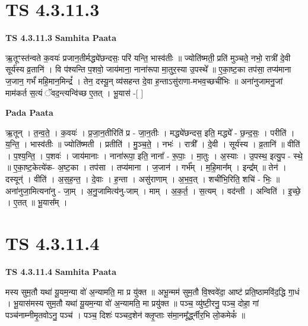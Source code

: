 \documentclass[17pt]{extarticle}
\begin{document}
\section*{ TS 4.3.11.3 }

\textbf{TS 4.3.11.3 } \newline
\textbf{Samhita Paata} \newline

ऋ॒तूꣳस्त॑न्वते क॒वयः॑ प्रजान॒तीर्मद्ध्ये॑छन्दसः॒ परि॑ यन्ति॒ भास्व॑तीः ॥ ज्योति॑ष्मती॒ प्रति॑ मुञ्चते॒ नभो॒ रात्री॑ दे॒वी सूर्य॑स्य व्र॒तानि॑ । वि प॑श्यन्ति प॒शवो॒ जाय॑माना॒ नाना॑रूपा मा॒तुर॒स्या उ॒पस्थे᳚ ॥ ए॒का॒ष्ट॒का तप॑सा॒ तप्य॑माना ज॒जान॒ गर्भं॑ महि॒मान॒मिन्द्रं᳚ । तेन॒ दस्यू॒न् व्य॑सहन्त दे॒वा ह॒न्ताऽसु॑राणा-मभव॒च्छची॑भिः ॥ अना॑नुजामनु॒जां माम॑कर्त स॒त्यं ॅवद॒न्त्यन्वि॑च्छ ए॒तत् । भू॒यास॑ -[  ] \newline

\textbf{Pada Paata} \newline

ऋ॒तून् । त॒न्व॒ते॒ । क॒वयः॑ । प्र॒जा॒न॒तीरिति॑ प्र - जा॒न॒तीः । मद्ध्ये॑छन्दस॒ इति॒ मद्ध्ये᳚ - छ॒न्द॒सः॒ । परीति॑ । य॒न्ति॒ । भास्व॑तीः ॥ ज्योति॑ष्मती । प्रतीति॑ । मु॒ञ्च॒ते॒ । नभः॑ । रात्री᳚ । दे॒वी । सूर्य॑स्य । व्र॒तानि॑ ॥ वीति॑ । प॒श्य॒न्ति॒ । प॒शवः॑ । जाय॑मानाः । नाना॑रूपा॒ इति॒ नाना᳚ - रू॒पाः॒ । मा॒तुः । अ॒स्याः । उ॒पस्थ॒ इत्यु॒प - स्थे॒ ॥ ए॒का॒ष्ट॒केत्ये॑क- अ॒ष्ट॒का । तप॑सा । तप्य॑माना । ज॒जान॑ । गर्भ᳚म् । म॒हि॒मान᳚म् । इन्द्र᳚म् ॥ तेन॑ । दस्यून्॑ । वीति॑ । अ॒स॒ह॒न्त॒ । दे॒वाः । ह॒न्ता । असु॑राणाम् । अ॒भ॒व॒त् । शची॑भि॒रिति॒ शचि॑ - भिः॒ ॥ अना॑नुजा॒मित्यना॑नु - जा॒म् । अ॒नु॒जामित्य॑नु-जाम् । माम् । अ॒क॒र्त॒ । स॒त्यम् । वद॑न्ती । अन्विति॑ । इ॒च्छे॒ । ए॒तत् ॥ भू॒यास᳚म् ।  \newline




\section*{ TS 4.3.11.4 }

\textbf{TS 4.3.11.4 } \newline
\textbf{Samhita Paata} \newline

मस्य सुम॒तौ यथा॑ यू॒यम॒न्या वो॑ अ॒न्यामति॒ मा प्र यु॑क्त ॥ अभू॒न्मम॑ सुम॒तौ वि॒श्ववे॑दा॒ आष्ट॑ प्रति॒ष्ठामवि॑द॒द्धि गा॒धं । भू॒यास॑मस्य सुम॒तौ यथा॑ यू॒यम॒न्या वो॑ अ॒न्यामति॒ मा प्रयु॑क्त ॥ पञ्च॒ व्यु॑ष्टी॒रनु॒ पञ्च॒ दोहा॒ गां पञ्च॑नाम्नीमृ॒तवोऽनु॒ पञ्च॑ । पञ्च॒ दिशः॑ पञ्चद॒शेन॑ क्लृ॒प्ताः स॑मा॒नमू᳚र्द्ध्नीर॒भि लो॒कमेकं᳚ ॥ \newline
\end{document}
